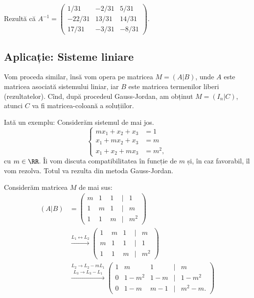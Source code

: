 Rezultă că $A^{-1} = \begin{pmatrix} 1/31 & -2/31 & 5/31 \\
  -22/31 & 13/31 & 14/31 \\
  17/31 & -3/31 & -8/31
\end{pmatrix}$.


\subsection{Aplicație: Sisteme liniare}
Vom proceda similar, însă vom opera pe matricea $M = (A | B)$, unde
$A$ este matricea asociată sistemului liniar, iar $B$ este matricea
termenilor liberi (rezultatelor). Cînd, după procedeul Gauss-Jordan,
am obținut $M = (I_n | C)$, atunci $C$ va fi matricea-coloană a soluțiilor.

Iată un exemplu: Considerăm sistemul de mai jos.
\[
  \begin{cases}
    mx_1 + x_2 + x_3  &= 1 \\
    x_1 + mx_2 + x_3 &= m \\
    x_1 + x_2 + mx_3 &= m^2,
  \end{cases}
\]
cu $m \in \RR$. Îi vom discuta compatibilitatea în funcție de $m$ și, în caz
favorabil, îl vom rezolva. Totul va rezulta din metoda Gauss-Jordan.

Considerăm matricea $M$ de mai sus:
\begin{align*}
  (A | B) &= \begin{pmatrix}
    m & 1 & 1 & \mid & 1 \\
    1 & m & 1 & \mid & m \\
    1 & 1 & m & \mid & m^2
  \end{pmatrix} \\
  &\xrightarrow{L_1 \leftrightarrow L_2}
  \begin{pmatrix}
    1 & m & 1 & \mid & m \\
    m & 1 & 1 & \mid & 1 \\
    1 & 1 & m & \mid & m^2
  \end{pmatrix} \\
  &\stackrel{L_2 \to L_2 - mL_1}{\xrightarrow{L_3 \to L_3 - L_1}}
  \begin{pmatrix}
    1 & m & 1 & \mid & m \\
    0 & 1 - m^2 & 1 - m & \mid & 1 - m^2 \\
    0 & 1 - m & m - 1 & \mid & m^2 - m.
  \end{pmatrix}
\end{align*}

